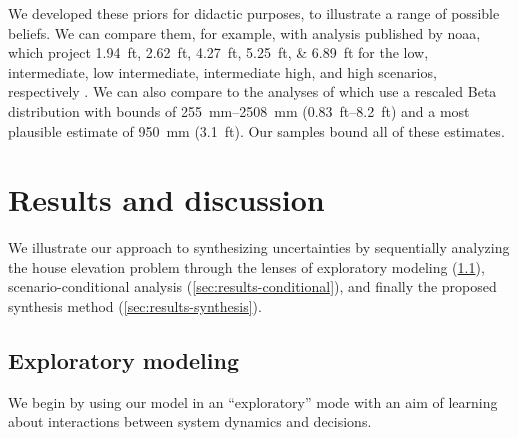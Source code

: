 \documentclass[11pt]{article}
\begin{document}
We developed these priors for didactic purposes, to illustrate a range of possible beliefs.
We can compare them, for example, with analysis published by \gls{noaa}, which project \SIlist{1.94;2.62;4.27;5.25;6.89}{ft} for the low, intermediate, low intermediate, intermediate high, and high scenarios, respectively \citep[table.~2.4]{sweet_slr:2022}.
We can also compare to the analyses of \citet{lempert_slr:2012,sriver_sealevel:2018} which use a rescaled Beta distribution with bounds of \SIrange{255}{2508}{\milli\meter} (\SIrange{0.83}{8.2}{ft}) and a most plausible estimate of \SI{950}{\milli\meter} (\SI{3.1}{ft}).
Our samples bound all of these estimates.

\section{Results and discussion}\label{sec:results}

We illustrate our approach to synthesizing uncertainties by sequentially analyzing the house elevation problem through the lenses of exploratory modeling (\cref{sec:results-exploratory}), scenario-conditional analysis (\cref{sec:results-conditional}), and finally the proposed synthesis method (\cref{sec:results-synthesis}).

\subsection{Exploratory modeling}\label{sec:results-exploratory}

We begin by using our model in an ``exploratory'' mode with an aim of learning about interactions between system dynamics and decisions.
\end{document}
